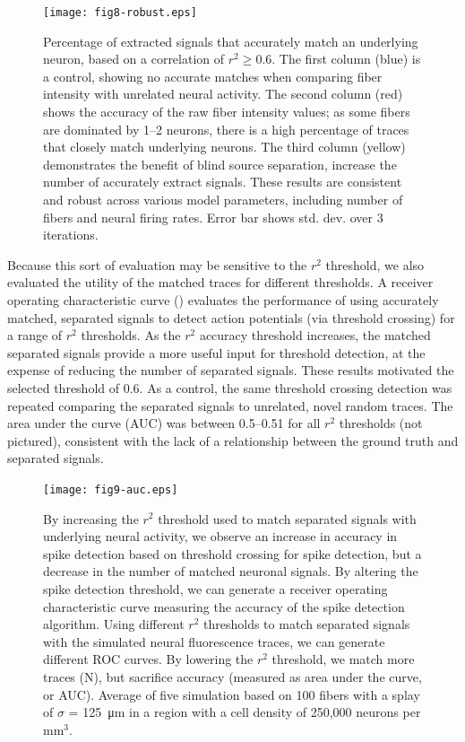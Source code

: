 \begin{figure}
\texttt{[image: fig8-robust.eps]}
\caption[Fraction of accurately matched signals across parameters]{Percentage of extracted signals that accurately match an underlying neuron, based on a correlation of $r^2 \geq 0.6$. The first column (blue) is a control, showing no accurate matches when comparing fiber intensity with unrelated neural activity. The second column (red) shows the accuracy of the raw fiber intensity values; as some fibers are dominated by 1--2 neurons, there is a high percentage of traces that closely match underlying neurons. The third column (yellow) demonstrates the benefit of blind source separation, increase the number of accurately extract signals. These results are consistent and robust across various model parameters, including number of fibers and neural firing rates. Error bar shows std. dev. over 3 iterations.}
\label{fig:robust}
\end{figure}

Because this sort of evaluation may be sensitive to the $r^2$ 
threshold, we also evaluated the utility of the matched traces for 
different thresholds. A receiver operating characteristic curve 
() evaluates the performance of using accurately matched, 
separated signals to detect action potentials (via threshold crossing)
 for a range of $r^2$ thresholds. As the $r^2$ accuracy threshold 
increases, the matched separated signals provide a more useful input 
for threshold detection, at the expense of reducing the number of 
separated signals. These results motivated the selected threshold of 
0.6. As a control, the same threshold crossing detection was repeated 
comparing the separated signals to unrelated, novel random traces. The
 area under the curve (AUC) was between 0.5--0.51 for all $r^2$ 
thresholds (not pictured), consistent with the lack of a relationship 
between the ground truth and separated signals.

\begin{figure}
\texttt{[image: fig9-auc.eps]}
\caption[Performance of source separation on threshold crossing task]{By increasing the $r^2$ threshold used to match separated signals with underlying neural activity, we observe an increase in accuracy in spike detection based on threshold crossing for spike detection, but a decrease in the number of matched neuronal signals. By altering the spike detection threshold, we can generate a receiver operating characteristic curve measuring the accuracy of the spike detection algorithm. Using different $r^2$ thresholds to match separated signals with the simulated neural fluorescence traces, we can generate different ROC curves. By lowering the $r^2$ threshold, we match more traces (N), but sacrifice accuracy (measured as area under the curve, or AUC). Average of five simulation based on 100 fibers with a splay of $\sigma$ = 125~\si{\micro\meter} in a region with a cell density of 250,000 neurons per mm$^3$.}
\label{fig:auc}
\end{figure}

